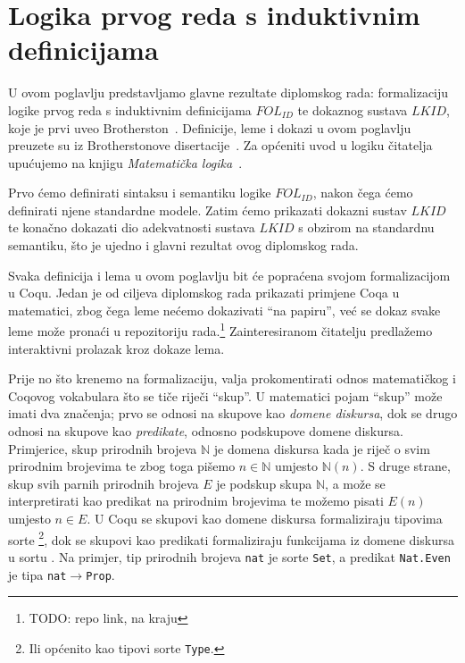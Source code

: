 \chapter{Logika prvog reda s induktivnim definicijama}\label{cha:logika-prvog-reda}
U ovom poglavlju predstavljamo glavne rezultate diplomskog rada: formalizaciju
logike prvog reda s induktivnim definicijama \(\mathit{FOL_{ID}}\)
te dokaznog sustava \(\mathit{LKID}\), koje je prvi uveo Brotherston~\cite{brotherston2005}.
Definicije, leme i dokazi u ovom poglavlju preuzete su iz Brotherstonove disertacije~\cite{brotherstonphd}.
Za općeniti uvod u logiku čitatelja upućujemo na knjigu \textit{Matematička logika}~\cite{vukovic}.

Prvo ćemo definirati sintaksu i semantiku logike \(\mathit{FOL_{ID}}\),
nakon čega ćemo definirati njene standardne modele.
Zatim ćemo prikazati dokazni sustav \(\mathit{LKID}\) te konačno dokazati dio adekvatnosti
sustava \(LKID\) s obzirom na standardnu semantiku,
što je ujedno i glavni rezultat ovog diplomskog rada.

Svaka definicija i lema u ovom poglavlju bit će popraćena svojom formalizacijom u Coqu.
Jedan je od ciljeva diplomskog rada prikazati primjene Coqa u matematici,
zbog čega leme nećemo dokazivati \enquote{na papiru},
već se dokaz svake leme može pronaći u repozitoriju rada.\footnote{TODO: repo link, na kraju}
Zainteresiranom čitatelju predlažemo interaktivni prolazak kroz dokaze lema.

Prije no što krenemo na formalizaciju, valja prokomentirati odnos matematičkog i Coqovog vokabulara
što se tiče riječi \enquote{skup}.
U matematici pojam \enquote{skup} može imati dva značenja;
prvo se odnosi na skupove kao \textit{domene diskursa},
dok se drugo odnosi na skupove kao \textit{predikate}, odnosno podskupove domene diskursa.
Primjerice, skup prirodnih brojeva \(\mathbb{N}\) je domena diskursa kada je riječ o svim prirodnim brojevima
te zbog toga pišemo \(n \in \mathbb{N}\) umjesto \(\mathbb{N}(n)\).
S druge strane, skup svih parnih prirodnih brojeva \(E\) je podskup skupa \(\mathbb{N}\), a može se interpretirati
kao predikat na prirodnim brojevima te možemo pisati \(E(n)\) umjesto \(n \in E\).
U Coqu se skupovi kao domene diskursa formaliziraju tipovima sorte \coqset\footnote{Ili općenito kao tipovi sorte \texttt{Type}.},
dok se skupovi kao predikati formaliziraju funkcijama iz domene diskursa u sortu \coqprop.
Na primjer, tip prirodnih brojeva \texttt{nat} je sorte \texttt{Set}, a predikat \texttt{Nat.Even} je tipa \texttt{nat\(\rightarrow\)Prop}.

